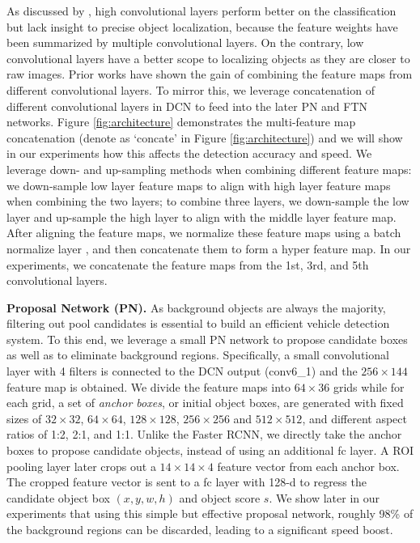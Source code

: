 \documentclass[5pt]{article}
\begin{document}
As discussed by \cite{ghodrati2015deepproposal}, high convolutional layers perform better on the classification but lack insight to precise object localization, because the feature weights have been summarized by multiple convolutional layers. On the contrary, low convolutional layers have a better scope to localizing objects as they are closer to raw images. Prior works \cite{ranjan2016hyperface,kong2016hypernet} have shown the gain of combining the feature maps from different convolutional layers. To mirror this, we leverage concatenation of different convolutional layers in DCN to feed into the later PN and FTN networks. Figure \ref{fig:architecture} demonstrates the multi-feature map concatenation (denote as `concate' in Figure \ref{fig:architecture}) and we will show in our experiments how this affects the detection accuracy and speed.  We leverage down- and up-sampling methods when combining different feature maps: we down-sample low layer feature maps to align with high layer feature maps when combining the two layers; to combine three layers, we down-sample the low layer and up-sample the high layer to align with the middle layer feature map. After aligning the feature maps, we normalize these feature maps using a batch normalize layer \cite{ioffe2015batch}, and then concatenate them to form a hyper feature map. In our experiments, we concatenate the feature maps from the 1st, 3rd, and 5th convolutional layers.

\vspace{0.08in}
\noindent\textbf{Proposal Network (PN).}
As background objects are always the majority, filtering out pool candidates is essential to build an efficient vehicle detection system. To this end, we leverage a small PN network to propose candidate boxes as well as to eliminate background regions.
Specifically, a small convolutional layer with 4 filters is connected to the DCN output (conv6\_1) and the $256\times144$ feature map is obtained. We divide the feature maps into $64\times36$ grids while for each grid, a set of \emph{anchor boxes}, or initial object boxes, are generated with fixed sizes of $32\times32$, $64\times64$, $128\times128$, $256\times256$ and $512\times512$, and different aspect ratios of 1:2, 2:1, and 1:1. Unlike the Faster RCNN, we directly take the anchor boxes to propose candidate objects, instead of using an additional fc layer. A ROI pooling layer later crops out a $14\times14\times4$ feature vector from each anchor box. The cropped feature vector is sent to a fc layer with 128-d to regress the candidate object box $(x, y, w, h)$ and object score $s$. We show later in our experiments that using this simple but effective proposal network, roughly 98\% of the background regions can be discarded, leading to a significant speed boost.
\end{document}
